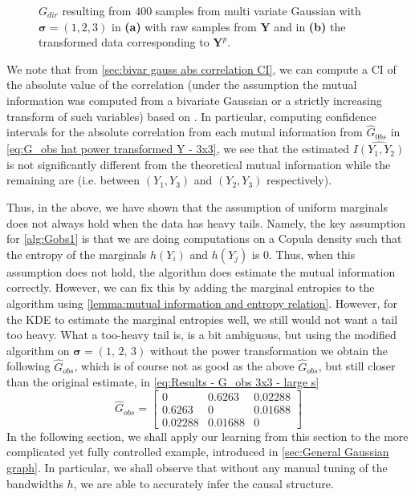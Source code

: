 \documentclass[../Thesis.tex]{subfiles}
\begin{document}
\begin{figure}[H]
\begin{subfigure}[t]{0.49\textwidth}
        \caption{}
        \label{fig:Gaussian 3x3 large s power}
    \end{subfigure}
    \caption{$G_{dir}$ resulting from $400$ samples from multi variate Gaussian with $\boldsymbol\sigma = (1,2,3)$ in \textbf{(a)} with raw samples from $\boldsymbol Y$ and in \textbf{(b)} the transformed data corresponding to $\boldsymbol Y^p$.}
    \label{fig:Gaussian 3x3 large s G_dir differences}
\end{figure}

We note that from \autoref{sec:bivar gauss abs correlation CI}, we can compute a CI of the absolute value of the correlation (under the assumption the mutual information was computed from a bivariate Gaussian or a strictly increasing transform of such variables) based on \cite{Confidence_in_Correlation}. In particular, computing confidence intervals for the absolute correlation from each mutual information from $\hat{G}_{0bs}$ in \autoref{eq:G_obs hat power transformed Y - 3x3}, we see that the estimated $\widehat{I\left(Y_1, Y_2\right)}$ is not significantly different from the theoretical mutual information while the remaining are (i.e. between $(Y_1, Y_3)$ and $(Y_2, Y_3)$ respectively).

Thus, in the above, we have shown that the assumption of uniform marginals does not always hold when the data has heavy tails. Namely, the key assumption for \autoref{alg:Gobs1} is that we are doing computations on a Copula density such that the entropy of the marginals $h\left(Y_i\right)$ and $h\left(Y_j\right)$ is $0$. Thus, when this assumption does not hold, the algorithm does estimate the mutual information correctly. However, we can fix this by adding the marginal entropies to the algorithm using \autoref{lemma:mutual information and entropy relation}. However, for the KDE to estimate the marginal entropies well, we still would not want a tail too heavy. What a too-heavy tail is, is a bit ambiguous, but using the modified algorithm on $\boldsymbol \sigma = \left(1,\, 2,\, 3\right)$ without the power transformation we obtain the following $\hat{G}_{obs}$, which is of course not as good as the above $\hat{G}_{obs}$, but still closer than the original estimate, in \autoref{eq:Results - G_obs 3x3 - large s}
$$\hat{G}_{obs} = \begin{bmatrix}
    0 & 0.6263 & 0.02288\\
    0.6263 & 0 & 0.01688\\
    0.02288 & 0.01688 & 0
\end{bmatrix}$$
In the following section, we shall apply our learning from this section to the more complicated yet fully controlled example, introduced in \autoref{sec:General Gaussian graph}. In particular, we shall observe that without any manual tuning of the bandwidths $h$, we are able to accurately infer the causal structure.
\end{document}
